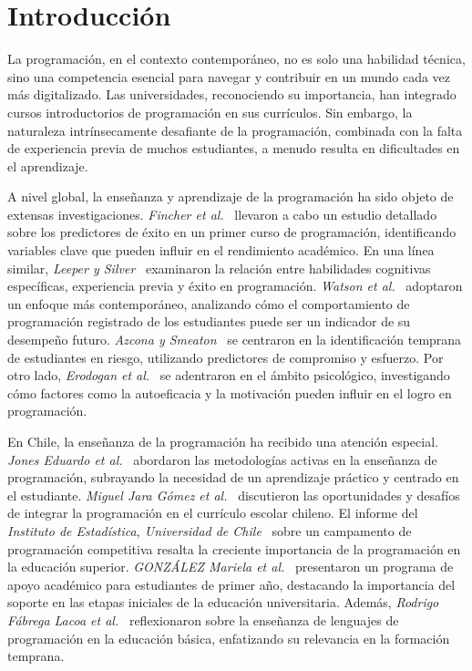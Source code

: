 \hypertarget{Introducción}{%
\section{Introducción}\label{Introducción}}

La programación, en el contexto contemporáneo, no es solo una habilidad técnica, sino una competencia esencial para navegar y contribuir en un mundo cada vez más digitalizado. Las universidades, reconociendo su importancia, han integrado cursos introductorios de programación en sus currículos. Sin embargo, la naturaleza intrínsecamente desafiante de la programación, combinada con la falta de experiencia previa de muchos estudiantes, a menudo resulta en dificultades en el aprendizaje.

A nivel global, la enseñanza y aprendizaje de la programación ha sido objeto de extensas investigaciones. \textit{Fincher et al.}~\cite{fincher2006predictors} llevaron a cabo un estudio detallado sobre los predictores de éxito en un primer curso de programación, identificando variables clave que pueden influir en el rendimiento académico. En una línea similar, \textit{Leeper y Silver}~\cite{leeper1982predicting} examinaron la relación entre habilidades cognitivas específicas, experiencia previa y éxito en programación. \textit{Watson et al.}~\cite{watson2013predicting} adoptaron un enfoque más contemporáneo, analizando cómo el comportamiento de programación registrado de los estudiantes puede ser un indicador de su desempeño futuro. \textit{Azcona y Smeaton}~\cite{azcona2017targeting} se centraron en la identificación temprana de estudiantes en riesgo, utilizando predictores de compromiso y esfuerzo. Por otro lado, \textit{Erodogan et al.}~\cite{erodogan2008exploring} se adentraron en el ámbito psicológico, investigando cómo factores como la autoeficacia y la motivación pueden influir en el logro en programación.

En Chile, la enseñanza de la programación ha recibido una atención especial. \textit{Jones Eduardo et al.}~\cite{metodologias2022activas} abordaron las metodologías activas en la enseñanza de programación, subrayando la necesidad de un aprendizaje práctico y centrado en el estudiante. \textit{Miguel Jara Gómez et al.}~\cite{oportunidades2017integrar} discutieron las oportunidades y desafíos de integrar la programación en el currículo escolar chileno. El informe del \textit{Instituto de Estadística, Universidad de Chile}~\cite{campamento2023programacion} sobre un campamento de programación competitiva resalta la creciente importancia de la programación en la educación superior. \textit{GONZÁLEZ Mariela et al.}~\cite{programa2022acompanamiento} presentaron un programa de apoyo académico para estudiantes de primer año, destacando la importancia del soporte en las etapas iniciales de la educación universitaria. Además, \textit{Rodrigo Fábrega Lacoa et al.}~\cite{ensenanza2016lenguajes} reflexionaron sobre la enseñanza de lenguajes de programación en la educación básica, enfatizando su relevancia en la formación temprana.

